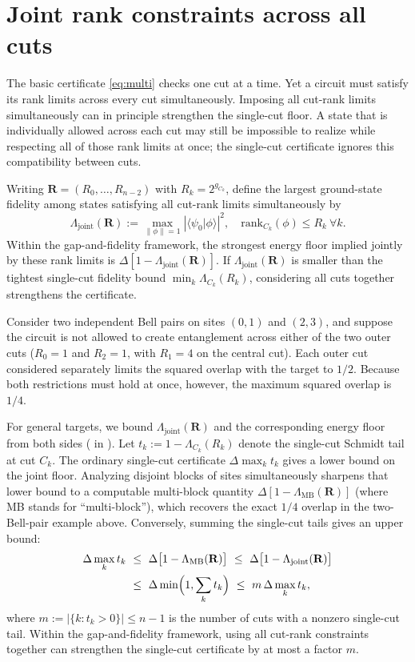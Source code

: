 \documentclass[reprint,aps,pra,floatfix,superscriptaddress,nofootinbib,longbibliography]{revtex4-2}
\theoremstyle{remark}
\theoremstyle{definition}
\newcommand{\braket}[2]{\langle #1 \vert #2 \rangle}
\newcommand{\rank}{\mathrm{rank}}
\begin{document}
\section{Joint rank constraints across all cuts}
\label{sec:joint}

The basic certificate \eqref{eq:multi} checks one cut at a time. Yet a circuit
must satisfy its rank limits across every cut simultaneously. Imposing all cut-rank limits simultaneously can in principle strengthen the
single-cut floor. A state that is
individually allowed across each cut may still be impossible to realize while
respecting all of those rank limits at once; the single-cut certificate ignores
this compatibility between cuts.

Writing $\mathbf{R}=(R_0,\dots,R_{n-2})$ with $R_k=2^{g_{C_k}}$, define the
largest ground-state fidelity among states satisfying all cut-rank limits
simultaneously by
\begin{equation}
  \Lambda_{\mathrm{joint}}(\mathbf{R})
  :=\max_{\|\phi\|=1}|\braket{\psi_0}{\phi}|^2,\quad
  \rank_{C_k}(\phi)\le R_k\ \forall k.
\end{equation} Within the gap-and-fidelity framework, the strongest
energy floor implied jointly by these rank limits is
$\Delta[1-\Lambda_{\mathrm{joint}}(\mathbf{R})]$. If $\Lambda_{\mathrm{joint}}(\mathbf{R})$
is smaller than the tightest single-cut fidelity bound $\min_k\Lambda_{C_k}(R_k)$,
considering all cuts together strengthens the certificate.

Consider two independent Bell pairs on sites $(0,1)$ and $(2,3)$, and suppose
the circuit is not allowed to create entanglement across either of the two outer
cuts ($R_0=1$ and $R_2=1$, with $R_1=4$ on the central cut). Each outer cut
considered separately limits the squared overlap with the target to $1/2$.
Because both restrictions must hold at once, however, the maximum squared
overlap is $1/4$.

For general targets, we bound $\Lambda_{\mathrm{joint}}(\mathbf{R})$ and the
corresponding energy floor from both sides ( in
). Let $t_k:=1-\Lambda_{C_k}(R_k)$ denote
the single-cut Schmidt tail at cut $C_k$. The ordinary single-cut certificate
$\Delta\max_k t_k$ gives a lower bound on the joint floor. Analyzing disjoint
blocks of sites simultaneously sharpens that lower bound to a computable
multi-block quantity $\Delta[1-\Lambda_{\mathrm{MB}}(\mathbf{R})]$ (where MB
stands for ``multi-block''), which recovers the exact $1/4$ overlap in the
two-Bell-pair example above. Conversely, summing the single-cut tails gives an
upper bound:
\begin{align}
  \label{eq:jointfloor}
  \Delta\max_k t_k\ &\le\ \Delta\bigl[1-\Lambda_{\mathrm{MB}}(\mathbf{R})\bigr]
  \ \le\ \Delta\bigl[1-\Lambda_{\mathrm{joint}}(\mathbf{R})\bigr]\nonumber\\
  &\le\ \Delta\min\Bigl(1,\sum_k t_k\Bigr)\ \le\ m\,\Delta\max_k t_k ,
\end{align}
where $m:=|\{k:t_k>0\}|\le n-1$ is the number of cuts with a nonzero
single-cut tail. Within the gap-and-fidelity framework, using
all cut-rank constraints together can strengthen the single-cut certificate by
at most a factor $m$.
\end{document}
